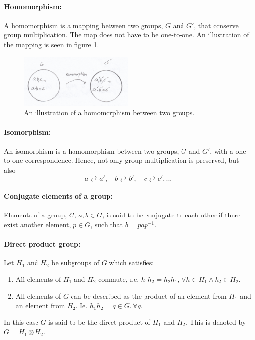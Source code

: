 \paragraph{Homomorphism: }
A homomorphism is a mapping between two groups, $G$ and $G'$, that conserve group multiplication. The map does not have to be one-to-one. An illustration of the mapping is seen in figure \ref{fig:3}.
\begin{figure}[h]
	\captionsetup{width=1\textwidth}
	\centering
	\includegraphics[width=0.5\textwidth]{figures//3}
	\caption{An illustration of a homomorphism between two groups.}
	\label{fig:3}
\end{figure}

\paragraph{Isomorphism: }
An isomorphism is a homomorphism between two groups, $G$ and $G'$, with a one-to-one correspondence. Hence, not only group multiplication is preserved, but also
\begin{equation}
	a \rightleftarrows a', \quad b \rightleftarrows b', \quad  c \rightleftarrows c',...
\end{equation}  
\paragraph{Conjugate elements of a group: }
Elements of a group, $G$, $a,b\in G$, is said to be conjugate to each other if there exist another element, $p\in G$, such that $b=pap^{-1}$.
\paragraph{Direct product group: }
Let $H_1$ and $H_2$ be subgroups of $G$ which satisfies:
\begin{enumerate}
	\item All elements of $H_1$ and $H_2$ commute, i.e. $h_1h_2=h_2h_1$, $\forall h\in H_1 \wedge h_2\in H_2$.
	\item All elements of $G$ can be described as the product of an element from $H_1$ and an element from $H_2$. Ie. $h_1h_2=g\in G, \forall g$. 
\end{enumerate}
In this case $G$ is said to be the direct product of $H_1$ and $H_2$. This is denoted by $G=H_1\otimes H_2$.

